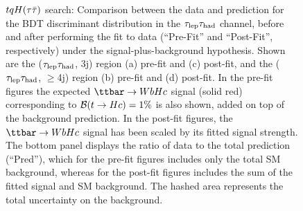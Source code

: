 \begin{figure}[htbp]
\begin{center}
\caption{\small{$tqH(\tau\bar{\tau})$ search: Comparison between the data and prediction for the BDT discriminant distribution in the
$\tau_{\mathrm{lep}} \tau_{\mathrm{had}}$ channel, before and after performing the fit to data  (``Pre-Fit'' and ``Post-Fit'', respectively) under the signal-plus-background hypothesis.
Shown are the ($\tau_{\mathrm{lep}} \tau_{\mathrm{had}}$, 3j) region (a) pre-fit and (c) post-fit, and the ($\tau_{\mathrm{lep}} \tau_{\mathrm{had}}$, $\geq$4j) region (b) pre-fit and (d) post-fit.
In the pre-fit figures the expected $\Hc$ signal (solid red) corresponding to $\mathcal{B}(t\to Hc)=1\%$ is also shown,
added on top of the background prediction. In the post-fit figures, the $\Hc$ signal has been scaled by its fitted signal strength.
The bottom panel displays the ratio of data to the total prediction (``Pred''), which for the pre-fit figures includes only the total SM background,
whereas for the post-fit figures includes the sum of the fitted signal and SM background.
The hashed area represents the total uncertainty on the background. }}
\label{fig:prepostfit_unblinded_WbHc_lh}
\end{center}
\end{figure}

